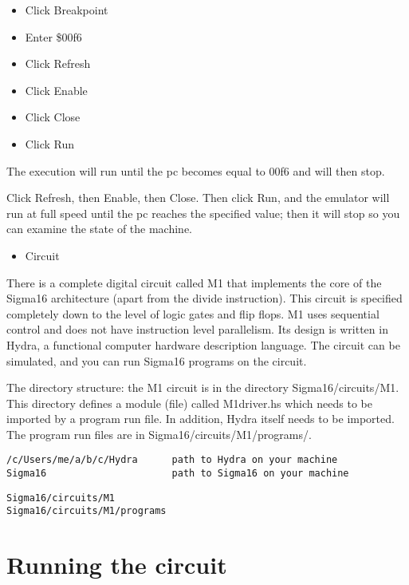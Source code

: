 \documentclass[11pt]{article}
\begin{document}
\begin{itemize}
\item Click Breakpoint
\item Enter \$00f6
\item Click Refresh
\item Click Enable
\item Click Close
\item Click Run
\end{itemize}

The execution will run until the pc becomes equal to 00f6
and will then stop.

Click Refresh, then Enable, then
Close.  Then click Run, and the emulator will run at full speed until
the pc reaches the specified value; then it will stop so you can
examine the state of the machine.


\begin{itemize}
\item Circuit
\end{itemize}

There is a complete digital circuit called M1 that implements the core
of the Sigma16 architecture (apart from the divide instruction).  This
circuit is specified completely down to the level of logic gates and
flip flops.  M1 uses sequential control and does not have instruction
level parallelism.  Its design is written in Hydra, a functional
computer hardware description language.  The circuit can be simulated,
and you can run Sigma16 programs on the circuit.

The directory structure: the M1 circuit is in the directory
Sigma16/circuits/M1.  This directory defines a module (file) called
M1driver.hs which needs to be imported by a program run file.  In
addition, Hydra itself needs to be imported.  The program run files
are in Sigma16/circuits/M1/programs/.

\begin{verbatim}
/c/Users/me/a/b/c/Hydra      path to Hydra on your machine
Sigma16                      path to Sigma16 on your machine
\end{verbatim}

\begin{verbatim}
Sigma16/circuits/M1
Sigma16/circuits/M1/programs
\end{verbatim}

\section*{Running the circuit}
\label{sec:org6bf862b}
\end{document}
